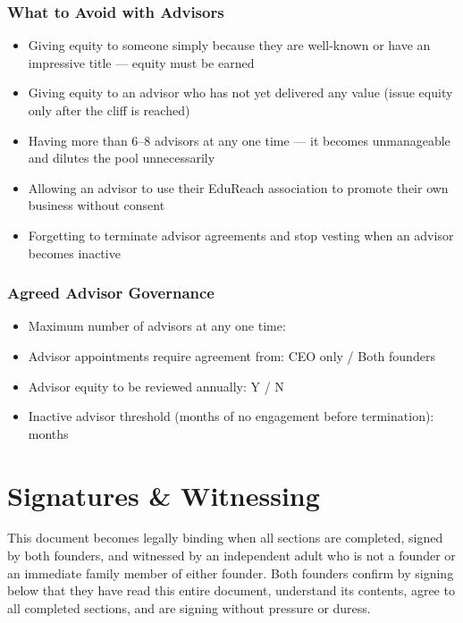 \documentclass[12pt,a4paper]{article}
\newcommand{\blank}[1][5.5cm]{\underline{\hspace{#1}}}
\begin{document}
\subsubsection{What to Avoid with Advisors}

\begin{itemize}
  \item Giving equity to someone simply because they are well-known or have an impressive title --- equity must be earned
  \item Giving equity to an advisor who has not yet delivered any value (issue equity only after the cliff is reached)
  \item Having more than 6--8 advisors at any one time --- it becomes unmanageable and dilutes the pool unnecessarily
  \item Allowing an advisor to use their EduReach association to promote their own business without consent
  \item Forgetting to terminate advisor agreements and stop vesting when an advisor becomes inactive
\end{itemize}

\subsubsection{Agreed Advisor Governance}

\begin{itemize}
  \item Maximum number of advisors at any one time: \blank[2cm]
  \item Advisor appointments require agreement from: \quad CEO only \;/\; Both founders
  \item Advisor equity to be reviewed annually: Y \;/\; N
  \item Inactive advisor threshold (months of no engagement before termination): \blank[2cm] months
\end{itemize}

\newpage
\section*{Signatures \& Witnessing}

\begin{warnbox}
This document becomes legally binding when all sections are completed, signed by both founders, and witnessed by an independent adult who is not a founder or an immediate family member of either founder. Both founders confirm by signing below that they have read this entire document, understand its contents, agree to all completed sections, and are signing without pressure or duress.
\end{warnbox}
\end{document}
